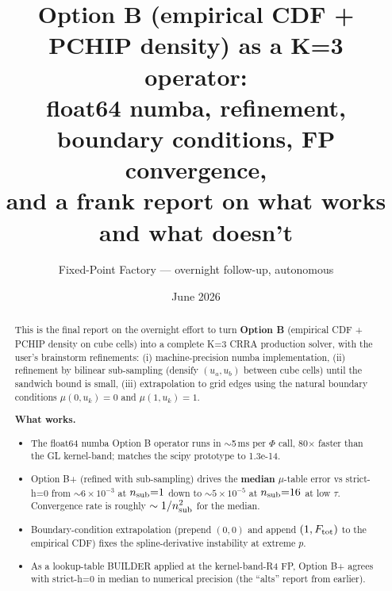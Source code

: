 \documentclass[11pt]{article}
\title{Option B (empirical CDF + PCHIP density) as a K=3 operator:\\
       float64 numba, refinement, boundary conditions, FP convergence,\\
       and a frank report on what works and what doesn't}
\author{Fixed-Point Factory --- overnight follow-up, autonomous}
\date{June 2026}
\begin{document}
\maketitle

\begin{abstract}
\noindent
This is the final report on the overnight effort to turn \textbf{Option B}
(empirical CDF + PCHIP density on cube cells) into a complete K=3 CRRA
production solver, with the user's brainstorm refinements:
(i) machine-precision numba implementation, (ii) refinement by
bilinear sub-sampling (densify $(u_a, u_b)$ between cube cells) until the
sandwich bound is small, (iii) extrapolation to grid edges using the natural
boundary conditions $\mu(0, u_k) = 0$ and $\mu(1, u_k) = 1$.

\textbf{What works.}
\begin{itemize}
  \item The float64 numba Option B operator runs in $\sim$5\,ms per $\Phi$
        call, 80$\times$ faster than the GL kernel-band; matches the scipy
        prototype to 1.3e-14.
  \item Option B+ (refined with sub-sampling) drives the \textbf{median}
        $\mu$-table error vs strict-h=0 from $\sim 6\!\times\!10^{-3}$ at
        $n_{\rm sub}{=}1$ down to $\sim 5\!\times\!10^{-5}$ at
        $n_{\rm sub}{=}16$ at low $\tau$. Convergence rate is roughly
        $\sim 1/n_{\rm sub}^{2}$ for the median.
  \item Boundary-condition extrapolation (prepend $(0, 0)$ and append
        $(1, F_{\rm tot})$ to the empirical CDF) fixes the spline-derivative
        instability at extreme $p$.
  \item As a lookup-table BUILDER applied at the kernel-band-R4 FP, Option B+
        agrees with strict-h=0 in median to numerical precision (the
        ``alts'' report from earlier).
\end{itemize}


\end{abstract}
\end{document}
